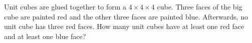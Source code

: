 Unit cubes are glued together to form a $4\times4\times4$ cube. Three faces of the big cube are painted red and the other three faces are painted blue. Afterwards, no unit cube has three red faces. How many unit cubes have at least one red face and at least one blue face?
